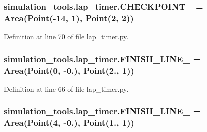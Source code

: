\subsubsection[{\texorpdfstring{C\+H\+E\+C\+K\+P\+O\+I\+N\+T\+\_\+3}{CHECKPOINT_3}}]{\setlength{\rightskip}{0pt plus 5cm}simulation\+\_\+tools.\+lap\+\_\+timer.\+C\+H\+E\+C\+K\+P\+O\+I\+N\+T\+\_ = {\bf Area}({\bf Point}(-\/14, 1), {\bf Point}(2, 2))}\hypertarget{namespacesimulation__tools_1_1lap__timer_a197a8c1ba2497108f555aa4d1670ccd7}{}\label{namespacesimulation__tools_1_1lap__timer_a197a8c1ba2497108f555aa4d1670ccd7}


Definition at line 70 of file lap\+\_\+timer.\+py.

\subsubsection[{\texorpdfstring{F\+I\+N\+I\+S\+H\+\_\+\+L\+I\+N\+E\+\_\+1}{FINISH_LINE_1}}]{\setlength{\rightskip}{0pt plus 5cm}simulation\+\_\+tools.\+lap\+\_\+timer.\+F\+I\+N\+I\+S\+H\+\_\+\+L\+I\+N\+E\+\_ = {\bf Area}({\bf Point}(0, -\/0.), {\bf Point}(2., 1))}\hypertarget{namespacesimulation__tools_1_1lap__timer_ae7d1eef6c19d3320b71be19367ec7fbd}{}\label{namespacesimulation__tools_1_1lap__timer_ae7d1eef6c19d3320b71be19367ec7fbd}


Definition at line 66 of file lap\+\_\+timer.\+py.

\subsubsection[{\texorpdfstring{F\+I\+N\+I\+S\+H\+\_\+\+L\+I\+N\+E\+\_\+2}{FINISH_LINE_2}}]{\setlength{\rightskip}{0pt plus 5cm}simulation\+\_\+tools.\+lap\+\_\+timer.\+F\+I\+N\+I\+S\+H\+\_\+\+L\+I\+N\+E\+\_ = {\bf Area}({\bf Point}(4, -\/0.), {\bf Point}(1., 1))}\hypertarget{namespacesimulation__tools_1_1lap__timer_ac066eea03916600e5942b91bba4204fa}{}\label{namespacesimulation__tools_1_1lap__timer_ac066eea03916600e5942b91bba4204fa}


